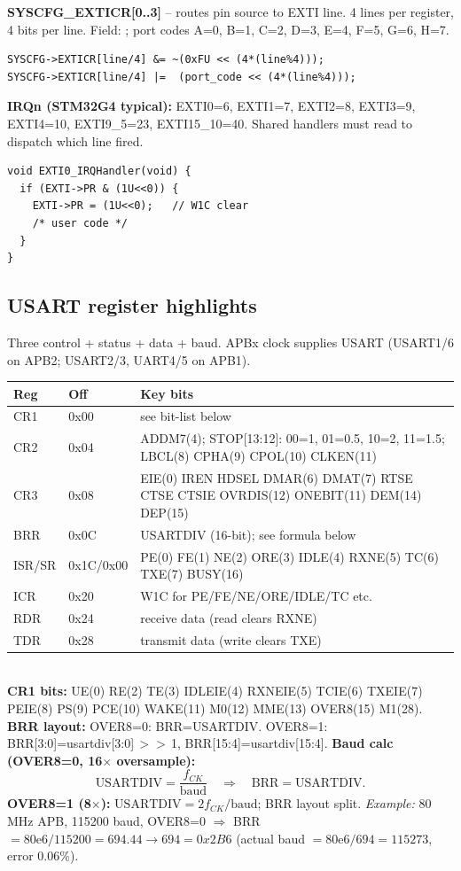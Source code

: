 \textbf{SYSCFG\_EXTICR[0..3]} -- routes pin source to EXTI line. 4 lines per register, 4 bits per line. Field: ; port codes A=0, B=1, C=2, D=3, E=4, F=5, G=6, H=7.
\begin{lstlisting}[language={}]
SYSCFG->EXTICR[line/4] &= ~(0xFU << (4*(line%4)));
SYSCFG->EXTICR[line/4] |=  (port_code << (4*(line%4)));
\end{lstlisting}
\textbf{IRQn (STM32G4 typical):} EXTI0=6, EXTI1=7, EXTI2=8, EXTI3=9, EXTI4=10, EXTI9\_5=23, EXTI15\_10=40. Shared handlers must read  to dispatch which line fired.
\begin{lstlisting}[language={}]
void EXTI0_IRQHandler(void) {
  if (EXTI->PR & (1U<<0)) {
    EXTI->PR = (1U<<0);   // W1C clear
    /* user code */
  }
}
\end{lstlisting}

\subsection{USART register highlights}
Three control + status + data + baud. APBx clock supplies USART (USART1/6 on APB2; USART2/3, UART4/5 on APB1).
\begin{tabular}{@{}llp{}@{}}
\toprule
\textbf{Reg} & \textbf{Off} & \textbf{Key bits}\\
\midrule
CR1 & 0x00 & see bit-list below\\
CR2 & 0x04 & ADDM7(4); STOP[13:12]: 00=1, 01=0.5, 10=2, 11=1.5; LBCL(8) CPHA(9) CPOL(10) CLKEN(11)\\
CR3 & 0x08 & EIE(0) IREN HDSEL DMAR(6) DMAT(7) RTSE CTSE CTSIE OVRDIS(12) ONEBIT(11) DEM(14) DEP(15)\\
BRR & 0x0C & USARTDIV (16-bit); see formula below\\
ISR/SR & 0x1C/0x00 & PE(0) FE(1) NE(2) ORE(3) IDLE(4) RXNE(5) TC(6) TXE(7) BUSY(16)\\
ICR & 0x20 & W1C for PE/FE/NE/ORE/IDLE/TC etc.\\
RDR & 0x24 & receive data (read clears RXNE)\\
TDR & 0x28 & transmit data (write clears TXE)\\
\bottomrule
\end{tabular}\\
\textbf{CR1 bits:} UE(0) RE(2) TE(3) IDLEIE(4) RXNEIE(5) TCIE(6) TXEIE(7) PEIE(8) PS(9) PCE(10) WAKE(11) M0(12) MME(13) OVER8(15) M1(28).\\
\textbf{BRR layout:} OVER8=0: BRR=USARTDIV. OVER8=1: BRR[3:0]=usartdiv[3:0]\,$>>$\,1, BRR[15:4]=usartdiv[15:4].
\textbf{Baud calc (OVER8=0, 16$\times$ oversample):}
\[ \text{USARTDIV} = \frac{f_{CK}}{\text{baud}} \quad\Rightarrow\quad \text{BRR}=\text{USARTDIV}. \]
\textbf{OVER8=1 (8$\times$):} $\text{USARTDIV} = 2 f_{CK}/\text{baud}$; BRR layout split. \emph{Example:} 80\,MHz APB, 115200 baud, OVER8=0 $\Rightarrow$ BRR $= 80\text{e}6/115200 = 694.44 \to 694 = 0x2B6$ (actual baud $= 80\text{e}6/694 = 115273$, error 0.06\%).

